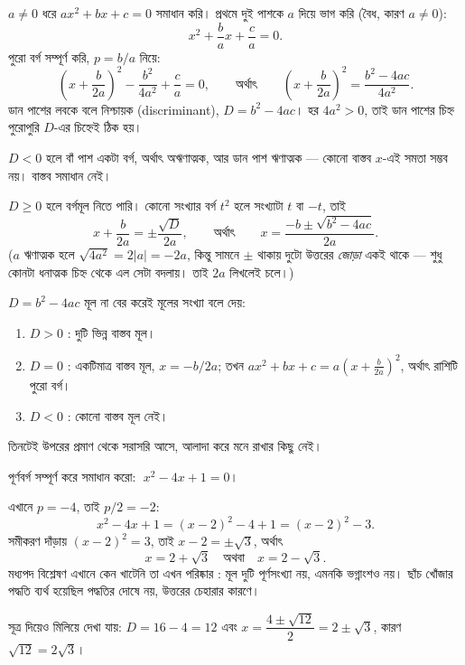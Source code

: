 \documentclass[11pt]{article}
\begin{document}
\begin{idea}
$a \neq 0$ ধরে $ax^{2} + bx + c = 0$ সমাধান করি। প্রথমে দুই পাশকে $a$ দিয়ে ভাগ
করি (বৈধ, কারণ $a \neq 0$):
\[
  x^{2} + \frac{b}{a}x + \frac{c}{a} = 0 .
\]
পুরো বর্গ সম্পূর্ণ করি, $p = b/a$ নিয়ে:
\[
  \left( x + \frac{b}{2a} \right)^{2} - \frac{b^{2}}{4a^{2}} + \frac{c}{a} = 0,
  \qquad\text{অর্থাৎ}\qquad
  \left( x + \frac{b}{2a} \right)^{2} = \frac{b^{2} - 4ac}{4a^{2}} .
\]
ডান পাশের লবকে বলে নিশ্চায়ক (discriminant), $D = b^{2} - 4ac$। হর $4a^{2} > 0$,
তাই ডান পাশের চিহ্ন পুরোপুরি $D$-এর চিহ্নেই ঠিক হয়।

$D < 0$ হলে বাঁ পাশ একটা বর্গ, অর্থাৎ অঋণাত্মক, আর ডান পাশ ঋণাত্মক --- কোনো
বাস্তব $x$-এই সমতা সম্ভব নয়। বাস্তব সমাধান নেই।

$D \geq 0$ হলে বর্গমূল নিতে পারি। কোনো সংখ্যার বর্গ $t^{2}$ হলে সংখ্যাটা
$t$ বা $-t$, তাই
\[
  x + \frac{b}{2a} = \pm \frac{\sqrt{D}}{2a},
  \qquad\text{অর্থাৎ}\qquad
  x = \frac{-b \pm \sqrt{b^{2} - 4ac}}{2a} .
\]
($a$ ঋণাত্মক হলে $\sqrt{4a^{2}} = 2|a| = -2a$, কিন্তু সামনে $\pm$ থাকায় দুটো
উত্তরের \emph{জোড়া} একই থাকে --- শুধু কোনটা ধনাত্মক চিহ্ন থেকে এল সেটা বদলায়।
তাই $2a$ লিখলেই চলে।)
\end{idea}

\begin{idea}[নিশ্চায়ক কী বলে]
$D = b^{2} - 4ac$ মূল না বের করেই মূলের সংখ্যা বলে দেয়:
\begin{enumerate}
  \item $D > 0$ : দুটি ভিন্ন বাস্তব মূল।
  \item $D = 0$ : একটিমাত্র বাস্তব মূল, $x = -b/2a$; তখন
        $ax^{2}+bx+c = a(x + \tfrac{b}{2a})^{2}$, অর্থাৎ রাশিটি পুরো বর্গ।
  \item $D < 0$ : কোনো বাস্তব মূল নেই।
\end{enumerate}
তিনটেই উপরের প্রমাণ থেকে সরাসরি আসে, আলাদা করে মনে রাখার কিছু নেই।
\end{idea}

\begin{example}
পূর্ণবর্গ সম্পূর্ণ করে সমাধান করো: $\;x^{2} - 4x + 1 = 0$।
\end{example}

\begin{solbox}
এখানে $p = -4$, তাই $p/2 = -2$:
\[
  x^{2} - 4x + 1 = (x - 2)^{2} - 4 + 1 = (x - 2)^{2} - 3 .
\]
সমীকরণ দাঁড়ায় $(x-2)^{2} = 3$, তাই $x - 2 = \pm\sqrt{3}$, অর্থাৎ
\[
  x = 2 + \sqrt{3} \quad\text{অথবা}\quad x = 2 - \sqrt{3}.
\]
মধ্যপদ বিশ্লেষণ এখানে কেন খাটেনি তা এখন পরিষ্কার : মূল দুটি পূর্ণসংখ্যা নয়,
এমনকি ভগ্নাংশও নয়। ছাঁচ খোঁজার পদ্ধতি ব্যর্থ হয়েছিল পদ্ধতির দোষে নয়, উত্তরের
চেহারার কারণে।

সূত্র দিয়েও মিলিয়ে দেখা যায়: $D = 16 - 4 = 12$ এবং
$x = \dfrac{4 \pm \sqrt{12}}{2} = 2 \pm \sqrt{3}$, কারণ $\sqrt{12} = 2\sqrt{3}$।
\end{solbox}
\end{document}
